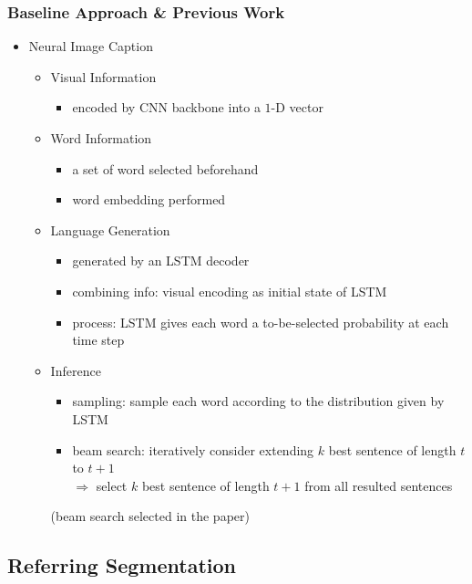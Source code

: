 \subsubsection{Baseline Approach \& Previous Work}
\begin{itemize}
\item Neural Image Caption
	\begin{itemize}
	\item Visual Information
		\begin{itemize}
		\item encoded by CNN backbone into a $1$-D vector
		\end{itemize}
	\item Word Information
		\begin{itemize}
		\item a set of word selected beforehand
		\item word embedding performed
		\end{itemize}
	\item Language Generation
		\begin{itemize}
		\item generated by an LSTM decoder
		\item combining info: visual encoding as initial state of LSTM
		\item process: LSTM gives each word a to-be-selected probability at each time step
		\end{itemize}
	\item Inference
		\begin{itemize}
		\item sampling: sample each word according to the distribution given by LSTM
		\item beam search: iteratively consider extending $k$ best sentence of length $t$ to $t+1$ \\
		$\Rightarrow$ select $k$ best sentence of length $t+1$ from all resulted sentences
		\end{itemize}
		(beam search selected in the paper)
	\end{itemize}
\end{itemize}


\subsection{Referring Segmentation}
